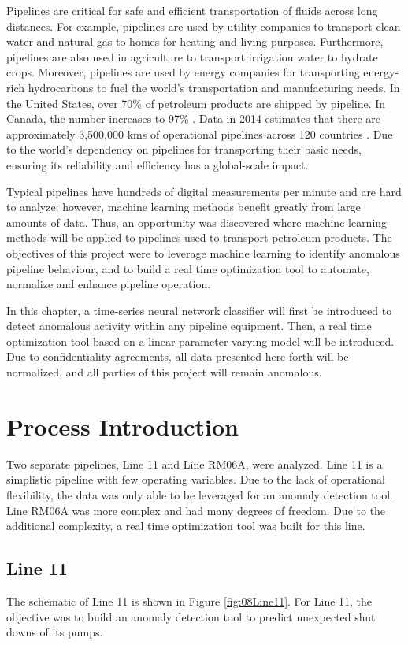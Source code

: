 Pipelines are critical for safe and efficient transportation of fluids across long distances.  For example, pipelines are used by utility companies to transport clean water and natural gas to homes for heating and living purposes.  Furthermore, pipelines are also used in agriculture to transport irrigation water to hydrate crops.  Moreover, pipelines are used by energy companies for transporting energy-rich hydrocarbons to fuel the world's transportation and manufacturing needs. In the United States, over 70\% of petroleum products are shipped by pipeline.  In Canada, the number increases to 97\% \cite{pipeline_transport}.  Data in 2014 estimates that there are approximately 3,500,000 kms of operational pipelines across 120 countries \cite{CIA_pipeline}. Due to the world's dependency on pipelines for transporting their basic needs, ensuring its reliability and efficiency has a global-scale impact.

Typical pipelines have hundreds of digital measurements per minute and are hard to analyze; however, machine learning methods benefit greatly from large amounts of data. Thus, an opportunity was discovered where machine learning methods will be applied to pipelines used to transport petroleum products. The objectives of this project were to leverage machine learning to identify anomalous pipeline behaviour, and to build a real time optimization tool to automate, normalize and enhance pipeline operation.

In this chapter, a time-series neural network classifier will first be introduced to detect anomalous activity within any pipeline equipment. Then, a real time optimization tool based on a linear parameter-varying model will be introduced.  Due to confidentiality agreements, all data presented here-forth will be normalized, and all parties of this project will remain anomalous.

\section{Process Introduction}
Two separate pipelines, Line 11 and Line RM06A, were analyzed.  Line 11 is a simplistic pipeline with few operating variables. Due to the lack of operational flexibility, the data was only able to be leveraged for an anomaly detection tool.  Line RM06A was more complex and had many degrees of freedom. Due to the additional complexity, a real time optimization tool was built for this line.

\subsection{Line 11}
The schematic of Line 11 is shown in Figure \ref{fig:08Line11}. For Line 11, the objective was to build an anomaly detection tool to predict unexpected shut downs of its pumps.  

